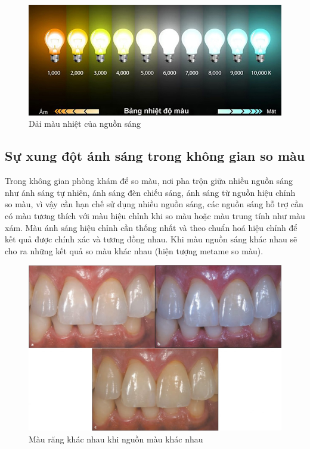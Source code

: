 \begin{figure}[h]
    \includegraphics[width=1\columnwidth]{pictures/bảng nhiệt độ màu K.jpeg}
    \caption{Dải màu nhiệt của nguồn sáng}
    \label{fig:bảng nhiệt độ màu K}
\end{figure}

\subsection{Sự xung đột ánh sáng trong không gian so màu}
\vspace{-5pt}
\qquad Trong không gian phòng khám để so màu, nơi pha trộn giữa nhiều nguồn sáng như ánh sáng tự nhiên, ánh sáng đèn chiếu sáng, ánh sáng từ nguồn hiệu chỉnh so màu, vì vậy cần hạn chế sử dụng nhiều nguồn sáng, các nguồn sáng hỗ trợ cần có màu tương thích với màu hiệu chỉnh khi so màu hoặc màu trung tính như màu xám. Màu ánh sáng hiệu chỉnh cần thống nhất và theo chuẩn hoá hiệu chỉnh để kết quả được chính xác và tương đồng nhau. Khi màu nguồn sáng khác nhau sẽ cho ra những kết quả so màu khác nhau (hiện tượng metame so màu).\cite{TruongDinhKhoi}


\begin{figure}[h]
    \includegraphics[width=1\columnwidth]{pictures/màu sắc răng khác nhau khi nguồn màu khác nhau.jpeg}
    \caption{Màu răng khác nhau khi nguồn màu khác nhau}
    \label{fig:màu sắc răng khác nhau khi nguồn màu khác nhau}
\end{figure}

